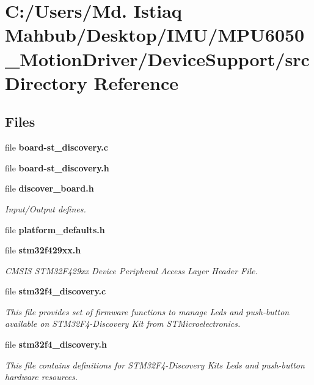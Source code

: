 \section{C\+:/\+Users/\+Md. Istiaq Mahbub/\+Desktop/\+I\+M\+U/\+M\+P\+U6050\+\_\+\+Motion\+Driver/\+Device\+Support/src Directory Reference}
\label{dir_ed63a76b210af9d6ec4a6f692b94d3d5}
\subsection*{Files}
\begin{DoxyCompactItemize}
\item 
file \textbf{ board-\/st\+\_\+discovery.\+c}
\item 
file \textbf{ board-\/st\+\_\+discovery.\+h}
\item 
file \textbf{ discover\+\_\+board.\+h}
\begin{DoxyCompactList}\small\item\em Input/\+Output defines. \end{DoxyCompactList}\item 
file \textbf{ platform\+\_\+defaults.\+h}
\item 
file \textbf{ stm32f429xx.\+h}
\begin{DoxyCompactList}\small\item\em C\+M\+S\+IS S\+T\+M32\+F429xx Device Peripheral Access Layer Header File. \end{DoxyCompactList}\item 
file \textbf{ stm32f4\+\_\+discovery.\+c}
\begin{DoxyCompactList}\small\item\em This file provides set of firmware functions to manage Leds and push-\/button available on S\+T\+M32\+F4-\/\+Discovery Kit from S\+T\+Microelectronics. \end{DoxyCompactList}\item 
file \textbf{ stm32f4\+\_\+discovery.\+h}
\begin{DoxyCompactList}\small\item\em This file contains definitions for S\+T\+M32\+F4-\/\+Discovery Kit\textquotesingle{}s Leds and push-\/button hardware resources. \end{DoxyCompactList}\item 

\end{DoxyCompactItemize}
